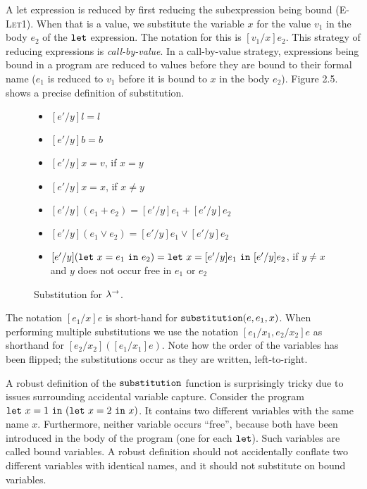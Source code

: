A let expression is reduced by first reducing the subexpression being bound (\textsc{E-Let1}). When that is a value, we substitute the variable $x$ for the value $v_1$ in the body $e_2$ of the $\mathtt{let}$ expression. The notation for this is $[v_1/x]e_2$. This strategy of reducing expressions is \textit{call-by-value}. In a call-by-value strategy, expressions being bound in a program are reduced to values before they are bound to their formal name ($e_1$ is reduced to $v_1$ before it is bound to $x$ in the body $e_2$). Figure 2.5. shows a precise definition of substitution.


\begin{figure}[h]


\begin{itemize}
	\setlength\itemsep{-0.7em}
	\item[] $[e'/y]l = l$
	\item[] $[e'/y]b = b$ 
	\item[] $[e'/y]x =  v$, if $x = y$
	\item[] $[e'/y]x = x$, if $x \neq y$
	\item[] $[e'/y](e_1 + e_2) = [e'/y]e_1 + [e'/y]e_2$
	\item[] $[e'/y](e_1 \lor e_2) = [e'/y]e_1 \lor [e'/y]e_2$
	\item[] $[e'/y](\mathtt{let}~ x = e_1~\mathtt{in}~ e_2) = \mathtt{let}~ x = [e'/y]e_1~\mathtt{in}~ [e'/y]e_2$, if $y \neq x$ and $y$ does not occur free in $e_1$ or $e_2$
\end{itemize}

\vspace{-7pt}
\caption{Substitution for $\lambda^{\rightarrow}$.}
\label{This is the label.}
\end{figure}

The notation $[e_1/x]e$ is short-hand for $\mathtt{substitution}(e, e_1, x)$. When performing multiple substitutions we use the notation $[e_1/x_1, e_2/x_2] e$ as shorthand for $[e_2/x_2]([e_1/x_1] e)$. Note how the order of the variables has been flipped; the substitutions occur as they are written, left-to-right.

A robust definition of the $\mathtt{substitution}$ function is surprisingly tricky due to issues surrounding accidental variable capture. Consider the program $\mathtt{let}~ x = 1~\mathtt{in}~ (\mathtt{let}~ x = 2~\mathtt{in}~ x)$. It contains two different variables with the same name $x$. Furthermore, neither variable occurs ``free'', because both have been introduced in the body of the program (one for each $\mathtt{let}$). Such variables are called bound variables. A robust definition should not accidentally conflate two different variables with identical names, and it should not substitute on bound variables.

